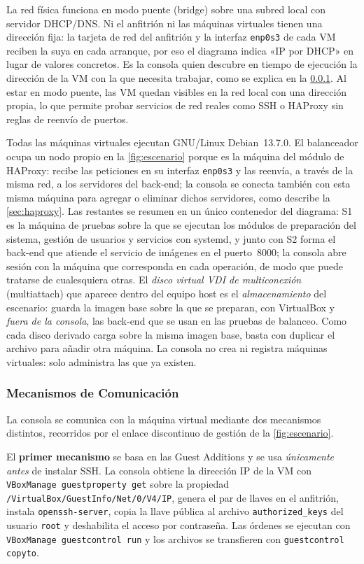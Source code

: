 La red física funciona en modo puente (bridge) sobre una subred local
con servidor DHCP/DNS. Ni el anfitrión ni las máquinas virtuales
tienen una dirección fija: la tarjeta de red del anfitrión y la
interfaz \texttt{enp0s3} de cada VM reciben la suya en cada arranque,
por eso el diagrama indica «IP por DHCP» en lugar de valores
concretos. Es la consola quien descubre en tiempo de ejecución la
dirección de la VM con la que necesita trabajar, como se explica en la
\cref{sec:mecanismo-com}. Al estar en modo puente, las VM quedan
visibles en la red local con una dirección propia, lo que permite
probar servicios de red reales como SSH o HAProxy sin reglas de
reenvío de puertos.

Todas las máquinas virtuales ejecutan GNU/Linux Debian~13.7.0. El
balanceador ocupa un nodo propio en la \cref{fig:escenario} porque es la
máquina del módulo de HAProxy: recibe las peticiones en su interfaz
\texttt{enp0s3} y las reenvía, a través de la misma red, a los
servidores del back-end; la consola se conecta también con esta misma
máquina para agregar o eliminar dichos servidores, como describe la
\cref{sec:haproxy}. Las restantes se resumen en un único contenedor
del diagrama: S1 es la máquina de pruebas sobre la que se ejecutan los
módulos de preparación del sistema, gestión de usuarios y servicios con
systemd, y junto con S2 forma el back-end que atiende el servicio de
imágenes en el puerto~8000; la consola abre sesión con la máquina que
corresponda en cada operación, de modo que puede tratarse de
cualesquiera otras.
El \emph{disco virtual VDI de multiconexión} (multiattach) que
aparece dentro del equipo host es el \emph{almacenamiento} del
escenario: guarda la imagen base sobre la que se preparan, con
VirtualBox y \emph{fuera de la consola}, las back-end que se usan en
las pruebas de balanceo. Como cada disco derivado carga sobre la misma
imagen base, basta con duplicar el archivo para añadir otra máquina.
La consola no crea ni registra máquinas virtuales: solo administra las
que ya existen.

\subsubsection{Mecanismos de Comunicación}
\label{sec:mecanismo-com}

La consola se comunica con la máquina virtual mediante dos mecanismos
distintos, recorridos por el enlace discontinuo de gestión de la
\cref{fig:escenario}.

El \textbf{primer mecanismo} se basa en las Guest Additions
\parencite{guestadditions} y se usa \emph{únicamente antes} de instalar
SSH. La consola obtiene la dirección IP de la VM con
\texttt{VBoxManage guestproperty get} sobre la propiedad
\texttt{/VirtualBox/GuestInfo/Net/0/V4/IP}, genera el par de llaves en el
anfitrión, instala \texttt{openssh-server}, copia la llave pública al
archivo \texttt{authorized\_keys} del usuario \texttt{root} y deshabilita
el acceso por contraseña. Las órdenes se ejecutan con
\texttt{VBoxManage guestcontrol run} y los archivos se transfieren con
\texttt{guestcontrol copyto}.

